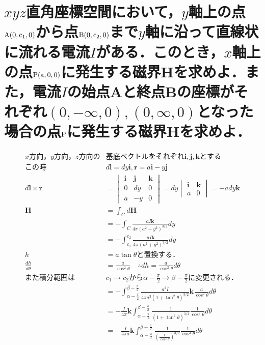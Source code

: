\documentclass[dvipdfmx]{ujarticle}
\begin{document}
\section{$xyz$直角座標空間において，$y$軸上の点$\rm{A}(0, c_{1}, 0)$から点$\rm{B}(0, c_{2}, 0)$まで$y$軸に沿って直線状に流れる電流$I$がある．このとき，$x$軸上の点$\rm{P}(a, 0, 0)$に発生する磁界$\boldsymbol{H}$を求めよ．また，電流$I$の始点Aと終点Bの座標がそれぞれ$(0, -\infty, 0), (0, \infty, 0)$となった場合の点$\rm{P}$に発生する磁界$\boldsymbol{H}$を求めよ．}
	\begin{align*}
	x方向，y方向，z方向の&基底ベクトルをそれぞれ\boldsymbol{i},\boldsymbol{j},\boldsymbol{k}とする\\
	この時&d\boldsymbol{l}=dy\boldsymbol{i}, \boldsymbol{r}=a\boldsymbol{i}-y\boldsymbol{j}\\
	d\boldsymbol{l}\times \boldsymbol{r}&=
	\begin{vmatrix}
	\boldsymbol{i} & \boldsymbol{j} & \boldsymbol{k}\\
	0 &dy & 0\\
	a & -y &0
	\end{vmatrix}
	=dy
	\begin{vmatrix}
	\boldsymbol{i}  & \boldsymbol{k}\\
	a & 0
	\end{vmatrix}
	=-ady\boldsymbol{k}\\
	\boldsymbol{H}&=\int_{C} d\boldsymbol{H}\\
	&=-\int_{C} \frac{aI\boldsymbol{k}}{4\pi(a^{2}+y^{2})^{3/2}}dy\\
	&=-\int_{c_{1}}^{c_{2}} \frac{aI\boldsymbol{k}}{4\pi(a^{2}+y^{2})^{3/2}}dy\\
	h&=a\tan \theta と置換する．\\
	\frac{dh}{d\theta}&=\frac{a}{\cos ^{2}\theta } \quad \therefore dh=\frac{a}{\cos ^{2}\theta }d\theta \\
	また積分範囲は&c_{1}\to c_{2}から\alpha-\frac{\pi}{2} \to \beta -\frac{\pi}{2}に変更される．\\
	&=-\int_{\alpha-\frac{\pi}{2}}^{\beta -\frac{\pi}{2}} \frac{a^{2}I}{4\pi a^{3}(1+\tan^{2}\theta)^{3/2}}\boldsymbol{k^{}} \frac{a}{\cos ^{2}\theta }d\theta\\
	&=-\frac{I}{4\pi} \boldsymbol{k} \int_{\alpha-\frac{\pi}{2}}^{\beta -\frac{\pi}{2}} \frac{1}{(1+\tan^{2}\theta)^{3/2}} \frac{1}{\cos ^{2}\theta }d\theta\\
	&=-\frac{I}{4\pi a} \boldsymbol{k} \int_{\alpha-\frac{\pi}{2}}^{\beta -\frac{\pi}{2}} \frac{1}{(\frac{1}{\cos^{2} \theta })^{3/2}} \frac{1}{\cos ^{2}\theta }d\theta\\

\end{align*}
\end{document}
